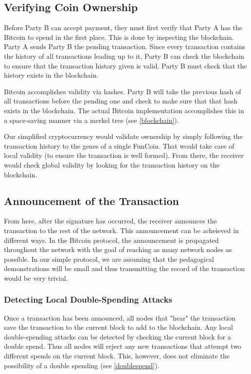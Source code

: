 \documentclass[12pt]{article}
\begin{document}
\subsection{Verifying Coin Ownership}
Before Party B can accept payment, they must first verify that Party A has the Bitcoin to spend in the first
place. This is done by inspecting the blockchain. Party A sends Party B the pending transaction. Since every
transaction contains the history of all transactions leading up to it, Party B can check the blockchain
to ensure that the transaction history given is valid. Party B must check that the history
exists in the blockchain.

Bitcoin accomplishes validity via hashes. Party B will take the previous hash of all transactions before the pending one
and check to make sure that that hash exists in the blockchain. The actual Bitcoin implementation accomplishes
this in a space-saving manner via a merkel tree (see \ref{blockchain}).

Our simplified cryptocurrency would validate ownership by simply following the transaction history to the
genes of a single FunCoin. That would take care of local validity (to ensure the transaction is well formed).
From there, the receiver would check global validity by looking for the transaction history on the blockchain.

\subsection{Announcement of the Transaction}
From here, after the signature has occurred, the receiver announces the transaction to the rest of the network.
This announcement can be acheieved in different ways. In the Bitcoin protocol, the announcement is propagated throughout
the network with the goal of reaching as many network nodes as possible. In our simple protocol, we are assuming
that the pedagogical demonstrations will be small and thus transmitting the record of the transaction would be very trivial.

\subsubsection{Detecting Local Double-Spending Attacks}
Once a transaction has been announced, all nodes that "hear" the transaction save the transaction to the current block to
add to the blockchain. Any local double-spending attacks can be detected by checking the current block for a double spend.
Thus all nodes will reject any new transactions that attempt two different spends on the current block. This, however, does
not eliminate the possibility of a double spending (see \ref{doublespend}).
\end{document}

